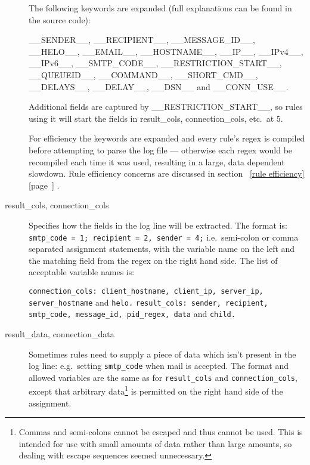 \documentclass[a4paper,12pt,draft]{article}
\newcommand{\refwithpage}[1]{%
    \empty{}\ref{#1} [page~\pageref{#1}]%
}
\begin{document}
\begin{description}
        The following keywords are expanded (full explanations can be found
        in the source code):

        \_\_SENDER\_\_, \_\_RECIPIENT\_\_, \_\_MESSAGE\_ID\_\_,
        \_\_HELO\_\_, \newline \_\_EMAIL\_\_, \_\_HOSTNAME\_\_, \_\_IP\_\_,
        \_\_IPv4\_\_, \_\_IPv6\_\_, \newline \_\_SMTP\_CODE\_\_,
        \_\_RESTRICTION\_START\_\_, \_\_QUEUEID\_\_, \newline
        \_\_COMMAND\_\_, \_\_SHORT\_CMD\_\_, \_\_DELAYS\_\_, \_\_DELAY\_\_,
        \_\_DSN\_\_ and \_\_CONN\_USE\_\_.

        Additional fields are captured by \_\_RESTRICTION\_START\_\_, so
        rules using it will start the fields in result\_cols,
        connection\_cols, etc.\ at 5.

        For efficiency the keywords are expanded and every rule's regex is
        compiled before attempting to parse the log file --- otherwise each
        regex would be recompiled each time it was used, resulting in a
        large, data dependent slowdown.  Rule efficiency concerns are
        discussed in section~\refwithpage{rule efficiency}.

    \item [result\_cols, connection\_cols] Specifies how the fields in the
        log line will be extracted.  The format is: \newline
        \texttt{smtp\_code = 1; recipient = 2, sender = 4;} \newline i.e.\
        semi-colon or comma separated assignment statements, with the
        variable name on the left and the matching field from the regex on
        the right hand side.  The list of acceptable variable names is:

        \texttt{connection\_cols: client\_hostname, client\_ip, server\_ip,
        \newline \hspace*{2em} server\_hostname} and \texttt{helo.\newline}
        \texttt{result\_cols: sender, recipient, smtp\_code, message\_id,
        \newline \hspace*{2em} pid\_regex, data} and \texttt{child.}

    \item [result\_data, connection\_data] Sometimes rules need to supply a
        piece of data which isn't present in the log line: e.g.\ setting
        \texttt{smtp\_code} when mail is accepted.  The format and allowed
        variables are the same as for \texttt{result\_cols} and
        \texttt{connection\_cols}, except that arbitrary
        data\footnote{Commas and semi-colons cannot be escaped and thus
        cannot be used.  This is intended for use with small amounts of
        data rather than large amounts, so dealing with escape sequences
        seemed unnecessary.} is permitted on the right hand side of the
        assignment.


\end{description}
\end{document}
